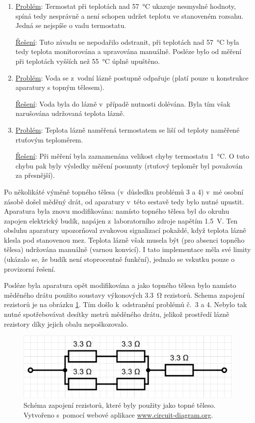 \documentclass[12pt]{article}
\begin{document}
\begin{enumerate}[noitemsep, topsep = 0pt]
    \item \underline{Problém}: Termostat při teplotách nad \SI{57}{\degreeCelsius} ukazuje nesmyslné hodnoty, spíná tedy nesprávně a není schopen udržet teplotu ve stanoveném rozsahu. Jedná se nejspíše o vadu termostatu.
    \par \underline{Řešení}: Tuto závadu se nepodařilo odstranit, při teplotách nad \SI{57}{\degreeCelsius} byla tedy teplota monitorována a upravována manuálně. Posléze bylo od měření při teplotách vyšších než \SI{55}{\degreeCelsius} úplně upuštěno.
    \item \underline{Problém}: Voda se z~vodní lázně postupně odpařuje (platí pouze u konstrukce aparatury s topným tělesem).
    \par \underline{Řešení}: Voda byla do lázně v~případě nutnosti dolévána. Byla tím však narušována udržovaná teplota lázně.
    \item \underline{Problém}: Teplota lázně naměřená termostatem se liší od teploty naměřené rtuťovým teploměrem.
    \par \underline{Řešení}: Při měření byla zaznamenána velikost chyby termostatu \SI{1}{\degreeCelsius}. O tuto chybu pak byly výsledky měření posunuty (rtuťový teploměr byl považován za přesnější).
\end{enumerate}
Po několikáté výměně topného tělesa (v~důsledku problémů 3 a 4) v~mé osobní zásobě došel měděný drát, od aparatury v~této sestavě tedy bylo nutné upustit. Aparatura byla znovu modifikována: namísto topného tělesa byl do okruhu zapojen elektrický budík, napájen z~laboratorního zdroje napětím \SI{1,5}{\volt}. Ten obsluhu aparatury upozorňoval zvukovou signalizací pokaždé, když teplota lázně klesla pod stanovenou mez. Teplota lázně však musela být (pro absenci topného tělesa) udržována manuálně (varnou konvicí). I tato implementace měla své limity (ukázalo se, že budík není stoprocentně funkční), jednalo se vskutku pouze o provizorní řešení.
\par
Posléze byla aparatura opět modifikována a jako topného tělesa bylo namísto měděného drátu použito soustavy výkonových \SI{3,3}{\ohm} rezistorů. Schema zapojení rezistorů je na obrázku \ref{fig:schema_zapojeni_rezistory}. Tím došlo k~odstranění problémů č.~3 a 4. Nebylo tak nutné spotřebovávat desítky metrů měděného drátu, jelikož prostředí lázně rezistory díky jejich obalu nepoškozovalo. 

\begin{figure}
    \centering
    \includegraphics[width = 0.75\linewidth]{figures/rezistory.png}
    \caption{Schéma zapojení rezistorů, které byly použity jako topné těleso. Vytvořeno s~pomocí webové aplikace \url{www.circuit-diagram.org}.}
    \label{fig:schema_zapojeni_rezistory}
\end{figure}
\end{document}

